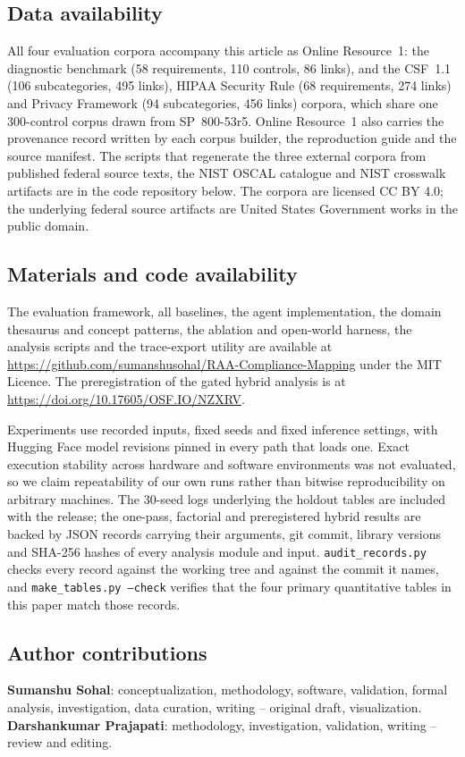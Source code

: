 \documentclass[smallextended,natbib]{svjour3}
\begin{document}
\subsection*{Data availability}
All four evaluation corpora accompany this article as Online Resource~1: the
diagnostic benchmark (58 requirements, 110 controls, 86 links), and the
CSF~1.1 (106 subcategories, 495 links), HIPAA Security Rule (68 requirements,
274 links) and Privacy Framework (94 subcategories, 456 links) corpora, which
share one 300-control corpus drawn from SP~800-53r5. Online Resource~1 also
carries the provenance record written by each corpus builder, the
reproduction guide and the source manifest. The scripts that regenerate the
three external corpora from published federal source texts, the NIST OSCAL
catalogue and NIST crosswalk artifacts are in the code repository below. The
corpora are licensed CC BY 4.0; the underlying federal source artifacts are
United States Government works in the public domain.

\subsection*{Materials and code availability}
The evaluation framework, all baselines, the agent implementation, the domain
thesaurus and concept patterns, the ablation and open-world harness, the
analysis scripts and the trace-export utility are available at
\url{https://github.com/sumanshusohal/RAA-Compliance-Mapping} under the MIT
Licence. The preregistration of the gated hybrid analysis is at
\url{https://doi.org/10.17605/OSF.IO/NZXRV}.

Experiments use recorded inputs, fixed seeds and fixed inference settings,
with Hugging Face model revisions pinned in every path that loads one. Exact
execution stability across hardware and software environments was not
evaluated, so we claim repeatability of our own runs rather than bitwise
reproducibility on arbitrary machines. The 30-seed logs underlying the
holdout tables are included with the release; the one-pass, factorial and
preregistered hybrid results are backed by JSON records carrying their
arguments, git commit, library versions and SHA-256 hashes of every analysis
module and input. \texttt{audit\_records.py} checks every record against the
working tree and against the commit it names, and \texttt{make\_tables.py
--check} verifies that the four primary quantitative tables in this paper
match those records.

\subsection*{Author contributions}
\textbf{Sumanshu Sohal}: conceptualization, methodology, software,
validation, formal analysis, investigation, data curation, writing --
original draft, visualization. \textbf{Darshankumar Prajapati}: methodology,
investigation, validation, writing -- review and editing.
\end{document}
